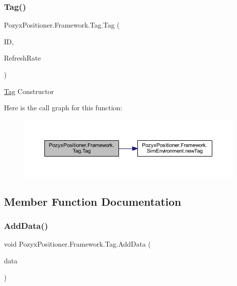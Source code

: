 \subsubsection{\texorpdfstring{Tag()}{Tag()}}
{\footnotesize\ttfamily Pozyx\+Positioner.\+Framework.\+Tag.\+Tag (\begin{DoxyParamCaption}\item[{string}]{ID,  }\item[{int}]{Refresh\+Rate }\end{DoxyParamCaption})}



\hyperlink{class_pozyx_positioner_1_1_framework_1_1_tag}{Tag} Constructor 

Here is the call graph for this function\+:
\nopagebreak
\begin{figure}[H]
\begin{center}
\leavevmode
\includegraphics[width=350pt]{class_pozyx_positioner_1_1_framework_1_1_tag_a9b58a1a5756bf3c8cda1e2afd32276b2_cgraph}
\end{center}
\end{figure}


\subsection{Member Function Documentation}
\mbox{\label{class_pozyx_positioner_1_1_framework_1_1_tag_ac2741e137c420ad71f64ee2d3d5fefe8}} 
\subsubsection{\texorpdfstring{Add\+Data()}{AddData()}}
{\footnotesize\ttfamily void Pozyx\+Positioner.\+Framework.\+Tag.\+Add\+Data (\begin{DoxyParamCaption}\item[{\hyperlink{struct_pozyx_positioner_1_1_framework_1_1_pos_data}{Pos\+Data}}]{data }\end{DoxyParamCaption})}



